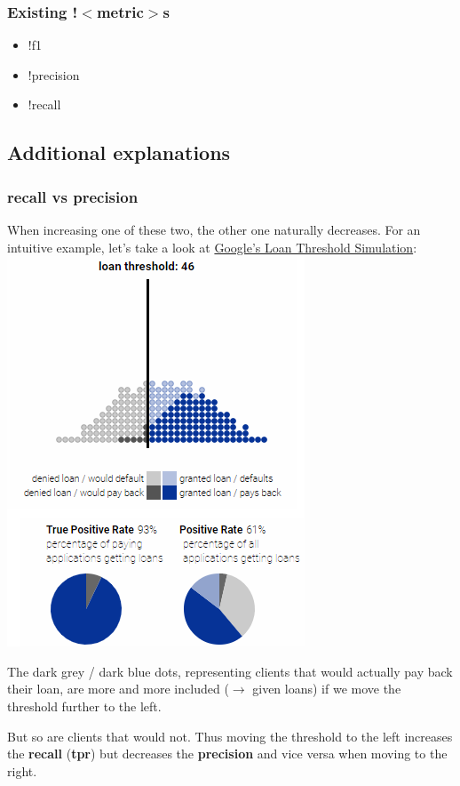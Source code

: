 \documentclass[12pt,a4paper]{article}
\begin{document}
\subsubsection{Existing !$<$metric$>$s}
\begin{itemize}
\item !f1
\item !precision
\item !recall
\end{itemize}
%
\subsection{Additional explanations}
\subsubsection{recall vs precision}
When increasing one of these two, the other one naturally decreases. For an intuitive example, let's take a look at \href{https://research.google.com/bigpicture/attacking-discrimination-in-ml/}{Google's Loan Threshold Simulation}:\\
\includegraphics[scale=0.6]{resources/3/loanML3}\\
\begin{description}
\item The dark grey / dark blue dots, representing clients that would actually pay back their loan, are more and more included ($\rightarrow$ given loans) if we move the threshold further to the left.
\item But so are clients that would not. Thus moving the threshold to the left increases the \textbf{recall} (\textbf{tpr}) but decreases the \textbf{precision} and vice versa when moving to the right.
\end{description}
%
\end{document}
